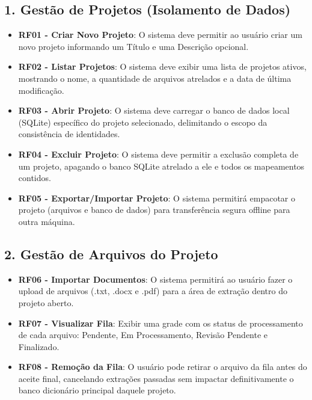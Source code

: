 \documentclass{scrreprt}
\begin{document}
\subsection*{1. Gestão de Projetos (Isolamento de Dados)}
\begin{itemize}
    \item \textbf{RF01 - Criar Novo Projeto}: O sistema deve permitir ao usuário criar um novo projeto informando um Título e uma Descrição opcional.
    \item \textbf{RF02 - Listar Projetos}: O sistema deve exibir uma lista de projetos ativos, mostrando o nome, a quantidade de arquivos atrelados e a data de última modificação.
    \item \textbf{RF03 - Abrir Projeto}: O sistema deve carregar o banco de dados local (SQLite) específico do projeto selecionado, delimitando o escopo da consistência de identidades.
    \item \textbf{RF04 - Excluir Projeto}: O sistema deve permitir a exclusão completa de um projeto, apagando o banco SQLite atrelado a ele e todos os mapeamentos contidos.
    \item \textbf{RF05 - Exportar/Importar Projeto}: O sistema permitirá empacotar o projeto (arquivos e banco de dados) para transferência segura offline para outra máquina.
\end{itemize}

\subsection*{2. Gestão de Arquivos do Projeto}
\begin{itemize}
    \item \textbf{RF06 - Importar Documentos}: O sistema permitirá ao usuário fazer o upload de arquivos (.txt, .docx e .pdf) para a área de extração dentro do projeto aberto.
    \item \textbf{RF07 - Visualizar Fila}: Exibir uma grade com os status de processamento de cada arquivo: Pendente, Em Processamento, Revisão Pendente e Finalizado.
    \item \textbf{RF08 - Remoção da Fila}: O usuário pode retirar o arquivo da fila antes do aceite final, cancelando extrações passadas sem impactar definitivamente o banco dicionário principal daquele projeto.
\end{itemize}
\end{document}
